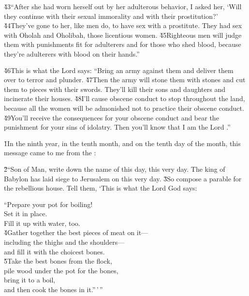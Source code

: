 \v{43}``After she had worn herself out by her adulterous behavior, I asked her, `Will they continue with their sexual immorality and with their prostitution?' \v{44}They've gone to her, like men do, to have sex with a prostitute. They had sex with Oholah and Oholibah, those licentious women. \v{45}Righteous men will judge them with punishments fit for adulterers and for those who shed blood, because they're adulterers with blood on their hands.''

\v{46}This is what the Lord  says: ``Bring an army against them and deliver them over to terror and plunder. \v{47}Then the army will stone them with stones and cut them to pieces with their swords. They'll kill their sons and daughters and incinerate their houses. \v{48}I'll cause obscene conduct to stop throughout the land, because all the women will be admonished not to practice their obscene conduct. \v{49}You'll receive the consequences for your obscene conduct and bear the punishment for your sins of idolatry. Then you'll know that I am the Lord .''

\v{1}In the ninth year, in the tenth month, and on the tenth day of the month, this message came to me from the :

\v{2}``Son of Man, write down the name of this day, this very day. The king of Babylon has laid siege to Jerusalem on this very day. \v{3}So compose a parable for the rebellious house. Tell them, `This is what the Lord God says:

\begin{poetry}
\poeml ``Prepare your pot for boiling! \\
\poemll    Set it in place. \\
\poemlll       Fill it up with water, too. \\
\poeml \v{4}Gather together the best pieces of meat on it--- \\
\poemll    including the thighs and the shoulders--- \\
\poemlll       and fill it with the choicest bones. \\
\poeml \v{5}Take the best bones from the flock, \\
\poemll    pile wood under the pot for the bones, \\
\poeml bring it to a boil, \\
\poemll    and then cook the bones in it.''\,'\,''
\end{poetry}

